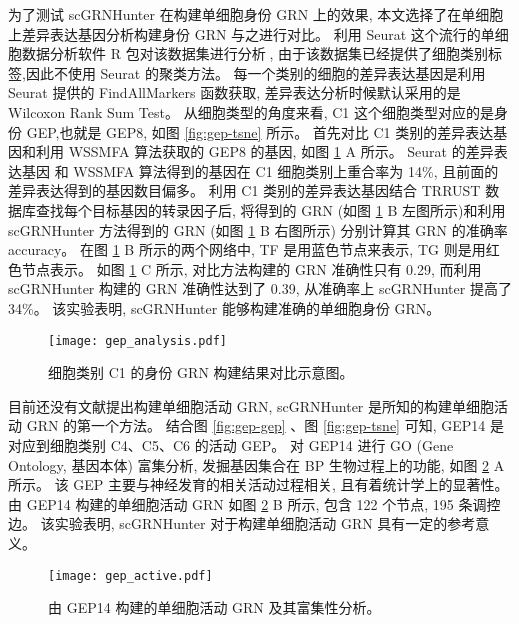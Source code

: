 为了测试 scGRNHunter 在构建单细胞身份 GRN 上的效果,
本文选择了在单细胞上差异表达基因分析构建身份 GRN 与之进行对比。 
利用 Seurat 这个流行的单细胞数据分析软件 R 包对该数据集进行分析,
由于该数据集已经提供了细胞类别标签,因此不使用 Seurat 的聚类方法。
每一个类别的细胞的差异表达基因是利用 Seurat 提供的 FindAllMarkers 函数获取, 
差异表达分析时候默认采用的是 Wilcoxon Rank Sum Test。
从细胞类型的角度来看, 
C1 这个细胞类型对应的是身份 GEP,也就是 GEP8, 如图 \ref{fig:gep-tsne} 所示。
首先对比 C1 类别的差异表达基因和利用 WSSMFA 算法获取的 GEP8 的基因, 如图 \ref{fig:gep-grn-comparison} A 所示。
Seurat 的差异表达基因 和 WSSMFA 算法得到的基因在 C1 细胞类别上重合率为 14\%, 且前面的差异表达得到的基因数目偏多。 
利用 C1 类别的差异表达基因结合 TRRUST 数据库查找每个目标基因的转录因子后, 
将得到的 GRN (如图 \ref{fig:gep-grn-comparison} B 左图所示)和利用 scGRNHunter 方法得到的 GRN (如图 \ref{fig:gep-grn-comparison} B 右图所示)
分别计算其 GRN 的准确率 accuracy。
在图 \ref{fig:gep-grn-comparison} B 所示的两个网络中, TF 是用蓝色节点来表示, TG 则是用红色节点表示。
如图 \ref{fig:gep-grn-comparison} C 所示, 对比方法构建的 GRN 准确性只有 0.29, 
而利用 scGRNHunter 构建的 GRN 准确性达到了 0.39, 从准确率上 scGRNHunter 提高了 34\%。
该实验表明, scGRNHunter 能够构建准确的单细胞身份 GRN。

\begin{figure}[!htbp]
    \centering
    \texttt{[image: gep\_analysis.pdf]}
    \caption{细胞类别 C1 的身份 GRN 构建结果对比示意图。}
    \label{fig:gep-grn-comparison}
\end{figure}


目前还没有文献提出构建单细胞活动 GRN, 
scGRNHunter 是所知的构建单细胞活动 GRN 的第一个方法。
结合图 \ref{fig:gep-gep} 、图 \ref{fig:gep-tsne} 可知, 
GEP14 是对应到细胞类别 C4、C5、C6 的活动 GEP。
对 GEP14 进行 GO (Gene Ontology, 基因本体) 富集分析, 发掘基因集合在 BP 生物过程上的功能, 如图 \ref{fig:gep-active} A 所示。
该 GEP 主要与神经发育的相关活动过程相关, 且有着统计学上的显著性。
由 GEP14 构建的单细胞活动 GRN 如图 \ref{fig:gep-active} B 所示, 包含 122 个节点, 195 条调控边。
该实验表明, scGRNHunter 对于构建单细胞活动 GRN 具有一定的参考意义。

\begin{figure}[!htbp]
    \centering
    \texttt{[image: gep\_active.pdf]}
    \caption{由 GEP14 构建的单细胞活动 GRN 及其富集性分析。}
    \label{fig:gep-active}
\end{figure}

